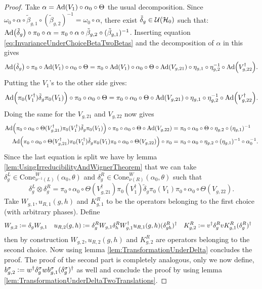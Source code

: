 \documentclass[11pt,a4paper,twoside]{article}
\numberwithin{equation}{section}
\begin{document}
	\begin{proof}
		Take $\alpha=\Ad{V_1}\circ\alpha_{0}\circ\Theta$ the usual decomposition. Since $\omega_0\circ\alpha\circ\tilde{\beta}_{g,1}\circ(\tilde{\beta}_{g,2})^{-1}=\omega_0\circ\alpha$, there exist $\tilde{\delta}_g\in\mathcal U(\mathcal H_0)$ such that: $\Ad{\tilde{\delta}_g}\circ\pi_0\circ\alpha=\pi_0\circ\alpha\circ\tilde{\beta}_{g,2}\circ(\tilde{\beta}_{g,1})^{-1}$. Inserting equation \eqref{eq:InvarianceUnderChoiceBetaTwoBetas} and the decomposition of $\alpha$ in this gives
		\begin{equation}
			\Ad{\tilde{\delta}_g}\circ\pi_0\circ\Ad{V_1}\circ\alpha_0\circ\Theta=\pi_0\circ\Ad{V_1}\circ\alpha_0\circ\Theta\circ\Ad{V_{g,21}}\circ\eta_{g,1}\circ\eta_{g,2}^{-1}\circ\Ad{V_{g,22}^\dagger}.
		\end{equation}
		Putting the $V_1$'s to the other side gives:
		\begin{equation}
			\Ad{\pi_0(V_1^\dagger) \tilde{\delta}_g\pi_0(V_1)}\circ\pi_0\circ\alpha_0\circ\Theta=\pi_0\circ\alpha_0\circ\Theta\circ\Ad{V_{g,21}}\circ\eta_{g,1}\circ\eta_{g,2}^{-1}\circ\Ad{V_{g,22}^\dagger}.
		\end{equation}
		Doing the same for the $V_{g,21}$ and $V_{g,22}$ now gives
		\begin{align}
			\Ad{\pi_0\circ\alpha_0\circ\Theta(V_{g,21}^\dagger)\pi_0(V_1^\dagger)\tilde{\delta}_g\pi_0(V_1)}\circ\pi_0\circ\alpha_0\circ\Theta\circ\Ad{V_{g,22}}&=\pi_0\circ\alpha_0\circ\Theta\circ\eta_{g,2}\circ(\eta_{g,1})^{-1}\\
			\Ad{\pi_0\circ\alpha_0\circ\Theta(V_{g,21}^\dagger)\pi_0(V_1^\dagger)\tilde{\delta}_g\pi_0(V_1)\pi_0\circ\alpha_0\circ\Theta(V_{g,22})}\circ\pi_0&=\pi_0\circ\alpha_0\circ\eta_{g,2}\circ(\eta_{g,1})^{-1}\circ\alpha_0^{-1}.
		\end{align}
		Since the last equation is split we have by lemma \ref{lem:UsingIrreducibilityAndWignerTheorem} that we can take $\delta_g^L\in\textrm{Cone}_{\nu^{-1}(L)}^W(\alpha_0,\theta)$ and $\delta_g^R\in\textrm{Cone}_{\nu(R)}^W(\alpha_0,\theta)$ such that
		\begin{equation}
			\delta_g^L\otimes\delta_g^R=\pi_0\circ\alpha_0\circ\Theta(V_{g,21}^\dagger)\pi_0(V_1^\dagger)\tilde{\delta}_g\pi_0(V_1)\pi_0\circ\alpha_0\circ\Theta(V_{g,22}).
		\end{equation}
		Take $W_{g,1},u_{R,1}(g,h)$ and $K^R_{g,1}$ to be the operators belonging to the first choice (with arbitrary phases). Define
		\begin{align}
			W_{g,2}&\vcentcolon=\delta_g W_{g,1}&u_{R,2}(g,h)&\vcentcolon= \delta_g^R W_{g,1}\delta_h^R W_{g,1}^\dagger u_{R,1}(g,h)(\delta_{gh}^R)^\dagger&K^R_{g,2}&\vcentcolon= v^\dagger \delta_g^R v K_{g,1}^R (\delta_g^R)^\dagger
		\end{align}
		then by construction $W_{g,2},u_{R,2}(g,h)$ and $K^R_{g,2}$ are operators belonging to the second choice. Now using lemma \ref{lem:TransformationUnderDelta} concludes the proof. The proof of the second part is completely analogous, only we now define, $b_{g,2}^\sigma\vcentcolon= w^\dagger\delta^\sigma_g w b_{g,1}^\sigma (\delta^\sigma_g)^\dagger$ as well and conclude the proof by using lemma \ref{lem:TransformationUnderDeltaTwoTranslations}.
	\end{proof}
\end{document}
